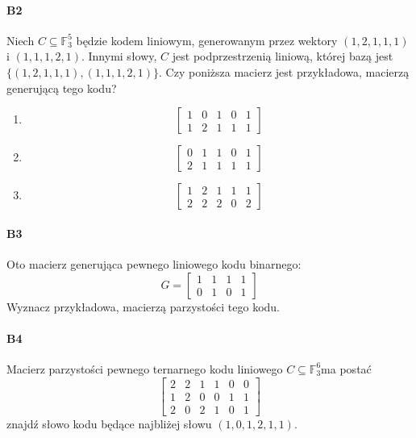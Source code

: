 \documentclass[a4paper,12pt]{article}
\theoremstyle{definition}%
\theoremstyle{definition}
\theoremstyle{problem}
\begin{document}
\paragraph{B2} Niech $C\subseteq \mathbb{F}_3^5$ będzie kodem liniowym, generowanym przez wektory $(1,2,1,1,1)$ i $(1,1,1,2,1)$. Innymi słowy, $C$ jest podprzestrzenią liniową, której bazą jest $\{(1, 2, 1, 1, 1),(1, 1, 1, 2, 1)\}$. Czy poniższa macierz jest przykładowa, macierzą generującą tego kodu?
\begin{enumerate}[label=\alph*)]
\item $$\begin{bmatrix}
1& 0& 1& 0& 1\\
1& 2& 1& 1& 1 
\end{bmatrix}$$
\item  $$\begin{bmatrix}
0& 1& 1& 0& 1\\
2& 1& 1& 1& 1 
\end{bmatrix}$$
\item $$\begin{bmatrix}
1& 2& 1& 1& 1\\
2& 2& 2& 0& 2 
\end{bmatrix}$$
\end{enumerate}


\paragraph{B3} Oto macierz generująca pewnego liniowego kodu binarnego:
$$G =
\begin{bmatrix}
1& 1& 1& 1\\
0& 1& 0& 1 
\end{bmatrix}$$
Wyznacz przykładowa, macierzą parzystości tego kodu.

\paragraph{B4} Macierz parzystości pewnego ternarnego kodu liniowego $C\subseteq \mathbb{F}_3^6$ma postać
$$\begin{bmatrix}
2& 2& 1& 1& 0& 0\\
1& 2& 0& 0& 1& 1\\
2& 0& 2& 1& 0& 1
\end{bmatrix}$$
znajdź słowo kodu będące najbliżej słowu $(1, 0, 1, 2, 1, 1)$.
\end{document}
